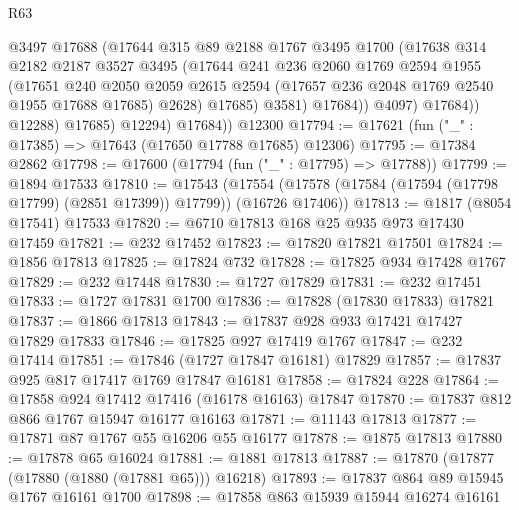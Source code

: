 \begin{lexlean}{R63}
\begin{coremodule}
                      @3497
                      @17688
                      (@17644
                        @315
                        @89
                        @2188
                        @1767
                        @3495
                        @1700
                        (@17638
                          @314
                          @2182
                          @2187
                          @3527
                          @3495
                          (@17644
                            @241
                            @236
                            @2060
                            @1769
                            @2594
                            @1955
                            (@17651
                              @240
                              @2050
                              @2059
                              @2615
                              @2594
                              (@17657 @236 @2048 @1769 @2540 @1955 @17688 @17685)
                              @2628)
                            @17685)
                          @3581)
                        @17684))
                    @4097)
                  @17684))
              @12288)
            @17685)
          @12294)
        @17684))
    @12300
@17794 := @17621 (fun ("_" : @17385) => @17643 (@17650 @17788 @17685) @12306)
@17795 := @17384 @2862
@17798 := @17600 (@17794 (fun ("_" : @17795) => @17788))
@17799 := @1894 @17533
@17810 := @17543
    (@17554 (@17578 (@17584 (@17594 (@17798 @17799) (@2851 @17399)) @17799)) (@16726 @17406))
@17813 := @1817 (@8054 @17541) @17533
@17820 := @6710 @17813 @168 @25 @935 @973 @17430 @17459
@17821 := @232 @17452
@17823 := @17820 @17821 @17501
@17824 := @1856 @17813
@17825 := @17824 @732
@17828 := @17825 @934 @17428 @1767
@17829 := @232 @17448
@17830 := @1727 @17829
@17831 := @232 @17451
@17833 := @1727 @17831 @1700
@17836 := @17828 (@17830 @17833) @17821
@17837 := @1866 @17813
@17843 := @17837 @928 @933 @17421 @17427 @17829 @17833
@17846 := @17825 @927 @17419 @1767
@17847 := @232 @17414
@17851 := @17846 (@1727 @17847 @16181) @17829
@17857 := @17837 @925 @817 @17417 @1769 @17847 @16181
@17858 := @17824 @228
@17864 := @17858 @924 @17412 @17416 (@16178 @16163) @17847
@17870 := @17837 @812 @866 @1767 @15947 @16177 @16163
@17871 := @11143 @17813
@17877 := @17871 @87 @1767 @55 @16206 @55 @16177
@17878 := @1875 @17813
@17880 := @17878 @65 @16024
@17881 := @1881 @17813
@17887 := @17870 (@17877 (@17880 (@1880 (@17881 @65))) @16218)
@17893 := @17837 @864 @89 @15945 @1767 @16161 @1700
@17898 := @17858 @863 @15939 @15944 @16274 @16161

\end{coremodule}
\end{lexlean}
